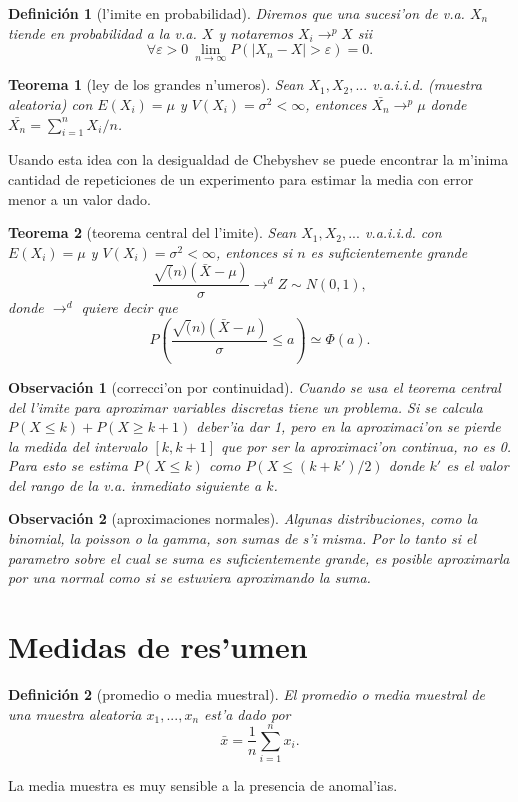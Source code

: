 \documentclass[a4paper,spanish]{article}
\newcommand{\limite}[2]{\lim_{ #1 \rightarrow #2}}
\newcommand{\eps}[0]{\varepsilon}
\newcommand{\tiendep}[0]{\longrightarrow^p}
\newcommand{\tiended}[0]{\longrightarrow^d}
\newtheorem{teo}{Teorema}
\newtheorem{defi}{Definici\'on}
\newtheorem{obs}{Observaci\'on}
\begin{document}
\begin{defi}[l'imite en probabilidad]
Diremos que una sucesi'on de v.a. $X_n$ tiende en probabilidad a la v.a. $X$
y notaremos $X_i \tiendep X$ sii
$$\forall \eps > 0\ \limite{n}{\infty} P(|X_n - X| > \eps) = 0.$$
\end{defi}

\begin{teo}[ley de los grandes n'umeros]
Sean $X_1,X_2,...$ v.a.i.i.d. (muestra aleatoria) con $E(X_i) = \mu$ y 
$V(X_i) = \sigma^2 < \infty$, entonces $\bar{X_n} \tiendep \mu$ donde
$\bar{X_n} = \sum_{i=1}^n X_i / n$.
\end{teo}
Usando esta idea con la desigualdad de Chebyshev se puede encontrar la m'inima 
cantidad de repeticiones de un experimento para estimar la media con error
menor a un valor dado.

\begin{teo}[teorema central del l'imite]
Sean $X_1,X_2,...$ v.a.i.i.d. con $E(X_i)=\mu$ y $V(X_i)=\sigma^2 < \infty$,
entonces si $n$ es suficientemente grande
$$\frac{\sqrt(n)(\bar{X} - \mu)}{\sigma} \tiended Z \sim N(0,1),$$
donde $\tiended$ quiere decir que
$$P\left(\frac{\sqrt(n)(\bar{X} - \mu)}{\sigma} \leq a\right)\simeq\Phi(a).$$
\end{teo}

\begin{obs}[correcci'on por continuidad]
Cuando se usa el teorema central del l'imite para aproximar variables discretas
tiene un problema. Si se calcula $P(X \leq k) + P(X \geq k+1)$ deber'ia dar 1,
pero en la aproximaci'on se pierde la medida del intervalo $[k,k+1]$ que por
ser la aproximaci'on continua, no es 0. Para esto se estima $P(X \leq k)$ como
$P(X \leq (k+k')/2)$ donde $k'$ es el valor del rango de la v.a. inmediato 
siguiente a $k$.
\end{obs}

\begin{obs}[aproximaciones normales]
Algunas distribuciones, como la binomial, la poisson o la gamma, son sumas de 
s'i misma. Por lo tanto si el parametro sobre el cual se suma es
suficientemente grande, es posible aproximarla por una normal como si se
estuviera aproximando la suma.
\end{obs}

\section{Medidas de res'umen}

\begin{defi}[promedio o media muestral]
El \emph{promedio} o \emph{media muestral} de una muestra aleatoria 
$x_1,...,x_n$ est'a dado por
$$\bar{x} = \frac{1}{n}\sum_{i=1}^n x_i.$$
\end{defi}
La media muestra es muy sensible a la presencia de anomal'ias.
\end{document}
